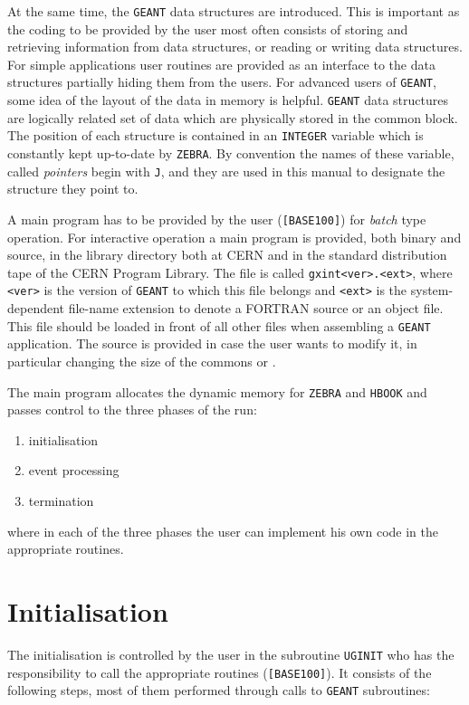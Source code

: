 At the same time, the {\tt GEANT} data structures are introduced. 
This is
important as the coding to be provided by the user
most often consists of storing and retrieving information from
data structures, or reading or writing data structures.
For simple applications
user routines are provided as an interface to the data structures
partially hiding them from the users. For advanced users of 
{\tt GEANT}, some idea of the layout of the data in memory is helpful.
{\tt GEANT} data structures are logically related set of data which are
physically stored in the  common block. The position
of each structure is contained in an {\tt INTEGER} variable which
is constantly kept up-to-date by {\tt ZEBRA}. By convention the names
of these variable, called {\it pointers} begin with {\tt J}, and they
are used in this manual to designate the structure they point to.

A main program has to be provided by the user ({\tt [BASE100]}) for
{\it batch} type operation. For interactive operation a main program is
provided, both binary and source, in the library directory
both at CERN and in the standard distribution tape of the CERN Program
Library. The file is called {\tt gxint<ver>.<ext>}, where {\tt <ver>}
is the version of {\tt GEANT} to which this file belongs and {\tt <ext>}
is the system-dependent file-name extension to denote a FORTRAN source
or an object file. This file should be loaded in front of all other
files when assembling a {\tt GEANT} application. The source is provided
in case the user wants to modify it, in particular changing the size
of the commons  or .

The main program allocates the dynamic memory for {\tt ZEBRA} and 
{\tt HBOOK} and passes control to the three phases of the run:
 
\begin{enumerate}
\item initialisation
\item event processing
\item termination
\end{enumerate}

where in each of the three phases the user can implement his own code
in the appropriate routines.
 
\section{Initialisation}

The initialisation is controlled by the user in the subroutine {\tt UGINIT}  
who has the responsibility to call the appropriate routines
({\tt [BASE100]}).
It consists of the following steps, most of them
performed through calls to {\tt GEANT} subroutines:
 
